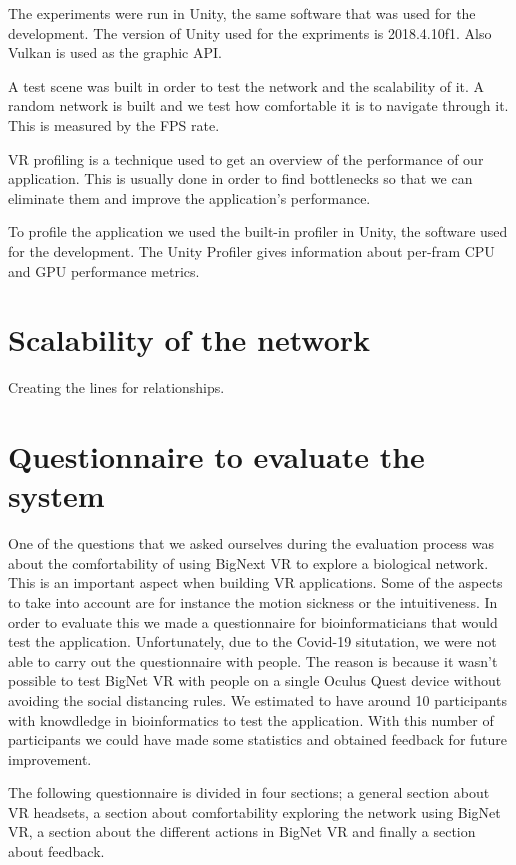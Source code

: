 The experiments were run in Unity, the same software that was used for the development. The version of Unity used for the expriments is 2018.4.10f1. Also Vulkan is used as the graphic API.

A test scene was built in order to test the network and the scalability of it. A random network is built and we test how comfortable it is to navigate through it. This is measured by the FPS rate.

VR profiling is a technique used to get an overview of the performance of our application. This is usually done in order to find bottlenecks so that we can eliminate them and improve the application's performance.

To profile the application we used the built-in profiler in Unity, the software used for the development. The Unity Profiler gives information about per-fram CPU and GPU performance metrics.

\section{Scalability of the network}
Creating the lines for relationships.

\section{Questionnaire to evaluate the system}
One of the questions that we asked ourselves during the evaluation process was about the comfortability of using BigNext VR to explore a biological network. This is an important aspect when building VR applications. Some of the aspects to take into account are for instance the motion sickness or the intuitiveness. In order to evaluate this we made a questionnaire for bioinformaticians that would test the application. Unfortunately, due to the Covid-19 situtation\cite{covid_19}, we were not able to carry out the questionnaire with people. The reason is because it wasn't possible to test BigNet VR with people on a single Oculus Quest device without avoiding the social distancing rules.
We estimated to have around 10 participants with knowdledge in bioinformatics to test the application. With this number of participants we could have made some statistics and obtained feedback for future improvement.

The following questionnaire is divided in four sections; a general section about VR headsets, a section about comfortability exploring the network using BigNet VR, a section about the different actions in BigNet VR and finally a section about feedback.

